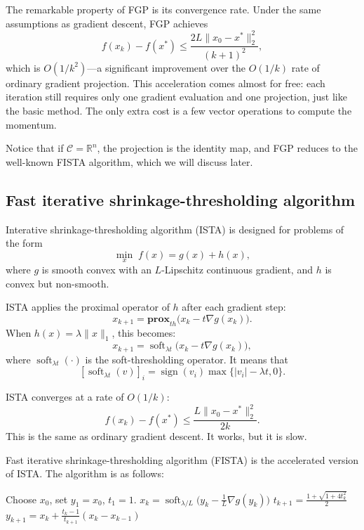 \documentclass[lang=en,color=blue,mode=fancy,titlestyle=hang]{elegantbook}
\begin{document}
The remarkable property of FGP is its convergence rate. Under the same assumptions as gradient
descent, FGP achieves
\[
f(x_k) - f(x^*) \le \frac{2L \|x_0 - x^*\|_2^2}{(k+1)^2},
\]
which is $O(1/k^2)$—a significant improvement over the $O(1/k)$ rate of ordinary gradient projection.
This acceleration comes almost for free: each iteration still requires only one gradient evaluation
and one projection, just like the basic method. The only extra cost is a few vector operations to
compute the momentum.

Notice that if $\mathcal{C} = \mathbb{R}^n$, the projection is the identity map, and FGP reduces to
the well-known FISTA algorithm, which we will discuss later.

\subsection{Fast iterative shrinkage-thresholding algorithm}

Interative shrinkage-thresholding algorithm (ISTA) is designed for problems of the form
\[
\min_{x} \; f(x) = g(x) + h(x),
\]
where $g$ is smooth convex with an $L$-Lipschitz continuous gradient, and $h$ is convex but non-smooth.

ISTA applies the proximal operator of $h$ after each gradient step:
\[
x_{k+1} = \mathbf{prox}_{t h}\bigl( x_k - t \nabla g(x_k) \bigr).
\]
When $h(x) = \lambda \|x\|_1$, this becomes:
\[
x_{k+1} = \operatorname{soft}_{\lambda t}\bigl( x_k - t \nabla g(x_k) \bigr),
\]
where $\operatorname{soft}_{\lambda t}(\cdot)$ is the soft-thresholding operator. It means that
\[
[\operatorname{soft}_{\lambda t}(v)]_i = \operatorname{sign}(v_i) \max\{|v_i| - \lambda t, 0\}.
\]

ISTA converges at a rate of $O(1/k)$:
\[
f(x_k) - f(x^*) \le \frac{L \|x_0 - x^*\|_2^2}{2k}.
\]
This is the same as ordinary gradient descent. It works, but it is slow.

Fast iterative shrinkage-thresholding algorithm (FISTA) is the accelerated version of ISTA. The
algorithm is as follows:

\begin{algorithm}[H]
\caption{Fast Iterative Shrinkage-Thresholding Algorithm}
\begin{algorithmic}
\State Choose $x_0$, set $y_1 = x_0$, $t_1 = 1$.
  \State $x_k = \operatorname{soft}_{\lambda/L}\bigl( y_k - \frac{1}{L} \nabla g(y_k) \bigr)$
  \State $t_{k+1} = \frac{1 + \sqrt{1 + 4t_k^2}}{2}$
  \State $y_{k+1} = x_k + \frac{t_k - 1}{t_{k+1}} (x_k - x_{k-1})$
\EndFor
\end{algorithmic}
\end{algorithm}
\end{document}
